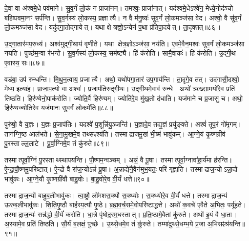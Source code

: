दे॒वा वा अ॑श्वमे॒धे पव॑माने।
सु॒व॒र्गं लो॒कं न प्राजा॑नन्।
तमश्वः॒ प्राजा॑नात्।
यद॑श्वमे॒धे\-ऽश्वे॑न॒ मेध्ये॒नोद॑ञ्चो बहिष्पवमा॒नꣳ सर्प॑न्ति।
सु॒व॒र्गस्य॑ लो॒कस्य॒ प्रज्ञात्यै।
न वै म॑नु॒ष्यः॑ सुव॒र्गं लो॒कमञ्ज॑सा वेद।
अश्वो॒ वै सु॑व॒र्गं लो॒कमञ्ज॑सा वेद।
यदु॑द्गा॒तोद्गायेत्।
यथा क्षेत्रज्ञो॒\-ऽन्येन॑ प॒था प्र॑तिपा॒दयेत्।
ता॒दृक्तत्॥८६॥

उ॒द्गा॒तार॑मप॒रुध्य॑।
अश्व॑मुद्गी॒थाय॑ वृणीते।
यथा क्षेत्र॒ज्ञो\-ऽञ्ज॑सा॒ नय॑ति।
ए॒वमे॒वैन॒मश्वः॑ सुव॒र्गं लो॒कमञ्ज॑सा नयति।
पुच्छ॑म॒न्वा र॑भन्ते।
सु॒व॒र्गस्य॑ लो॒कस्य॒ सम॑ष्ट्यै।
हिं क॑रोति।
सामै॒वाकः॑।
हिं क॑रोति।
उ॒द्गी॒थ ए॒वास्य॒ सः॥८७॥

वड॑बा॒ उप॑ रुन्धन्ति।
मि॒थु॒न॒त्वाय॒ प्रजात्यै।
अथो॒ यथो॑पगा॒तार॑ उप॒गाय॑न्ति।
ता॒दृगे॒व तत्।
उद॑गासी॒दश्वो॒ मेध्य॒ इत्या॑ह।
प्रा॒जा॒प॒त्यो वा अश्वः॑।
प्र॒जाप॑तिरुद्गी॒थः।
उ॒द्गी॒थमे॒वाव॑ रुन्धे।
अथो॑ ऋख्सा॒मयो॑रे॒व प्रति॑ तिष्ठति।
हिर॑ण्येनो॒पाक॑रोति।
ज्योति॒र्वै हिर॑ण्यम्।
ज्योति॑रे॒व मु॑ख॒तो द॑धाति।
यज॑माने च प्र॒जासु॑ च।
अथो॒ हिर॑ण्यज्योतिरे॒व यज॑मानः सुव॒र्गं लो॒कमे॑ति॥८८॥\anuvakamend[तथ्स उ॒पाक॑रोति च॒त्वारि॑ च]

पुरु॑षो॒ वै य॒ज्ञः।
य॒ज्ञः प्र॒जाप॑तिः।
यदश्वे॑ प॒शून्नि॑यु॒ञ्जन्ति॑।
य॒ज्ञादे॒व तद्य॒ज्ञं प्रयु॑ङ्क्ते।
अश्वं॑ तूप॒रं गो॑मृ॒गम्।
तान॑ग्नि॒ष्ठ आल॑भते।
से॒ना॒मु॒खमे॒व तथ्सꣴश्य॑ति।
तस्माद्राजमु॒खं भी॒ष्मं भावु॑कम्।
आ॒ग्ने॒यं कृ॒ष्णग्री॑वं पु॒रस्ताल्ल॒लाटे।
पू॒र्वा॒ग्निमे॒व तं कु॑रुते॥८९॥

तस्मात्पूर्वा॒ग्निं पु॒रस्ताथ्स्थापयन्ति।
पौ॒ष्णम॒न्वञ्चम्।
अन्नं॒ वै पू॒षा।
तस्मात्पूर्वा॒ग्नावा॑हा॒र्य॑मा ह॑रन्ति।
ऐ॒न्द्रा॒पौ॒ष्णमु॒परि॑ष्टात्।
ऐ॒न्द्रो वै रा॑ज॒न्यो\-ऽन्नं॑ पू॒षा।
अ॒न्नाद्ये॑नै॒वैन॑मुभ॒यतः॒ परि॑ गृह्णाति।
तस्माद्राज॒न्यो\-ऽन्ना॒दो भावु॑कः।
आ॒ग्ने॒यौ कृ॒ष्णग्री॑वौ बाहु॒वोः।
बा॒हु॒वोरे॒व वी॒र्यं धत्ते॥९०॥

तस्माद्राज॒न्यो॑ बाहुब॒लीभावु॑कः।
त्वा॒ष्ट्रौ लो॑मशस॒क्थौ स॒क्थ्योः।
स॒क्थ्योरे॒व वी॒र्यं॑ धत्ते।
तस्माद्राज॒न्य॑ ऊरुब॒लीभावु॑कः।
शि॒ति॒पृ॒ष्ठौ बा॑र्\mbox{}हस्प॒त्यौ पृ॒ष्ठे।
ब्र॒ह्म॒व॒र्च॒समे॒वोपरि॑ष्टाद्धत्ते।
अथो॑ क॒वचे॑ ए॒वैते अ॒भितः॒ पर्यू॑हते।
तस्माद्राज॒न्यः॑ सन्न॑द्धो वी॒र्यं॑ करोति।
धा॒त्रे पृ॑षोद॒रम॒धस्तात्।
प्र॒ति॒ष्ठामे॒वैतां कु॑रुते।
अथो॑ इ॒यं वै धा॒ता।
अ॒स्यामे॒व प्रति॑ तिष्ठति।
सौ॒र्यं ब॒लक्षं॒ पुच्छे।
उ॒थ्से॒धमे॒व तं कु॑रुते।
तम्मा॑दुथ्से॒धम्भ॒ये प्र॒जा अ॒भिसꣴश्र॑यन्ति॥९१॥\anuvakamend[कु॒रु॒ते॒ ध॒त्ते॒ कु॒रु॒ते॒ पञ्च॑ च]




\clearpage
{}
\setcounter{anuvakam}{0}

